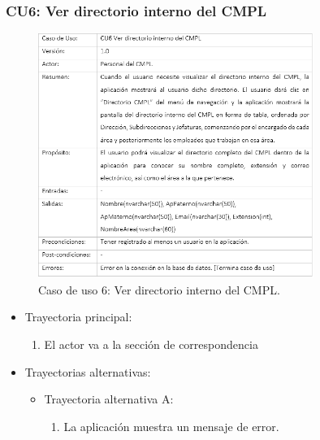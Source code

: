 		\subsubsection{CU6: Ver directorio interno del CMPL}
			\begin{figure}[htbp!]
				\centering
					\includegraphics[width=0.8\textwidth]{images/CU/CU6}
					\caption{Caso de uso 6: Ver directorio interno del CMPL.}
				\label{Tabla}
			\end{figure}
			
			\begin{itemize}
				\item Trayectoria principal:
					\begin{enumerate}
						\item El actor va a la sección de correspondencia 
					\end{enumerate}
				\item Trayectorias alternativas:
					\begin{itemize}
						\item Trayectoria alternativa A:
							\begin{enumerate}
								\item La aplicación muestra un mensaje de error.
							\end{enumerate}
					\end{itemize}
			\end{itemize}
			
